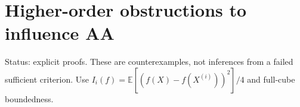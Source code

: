 \section{Higher-order obstructions to
influence AA}\label{proof:higher_order_obstructions}

Status: explicit proofs. These are counterexamples, not inferences from
a failed sufficient criterion. Use
\(I_{i}(f) = \mathbb E[(f(X)-f(X^{(i)}))^{2}]/4\) and full-cube boundedness.






